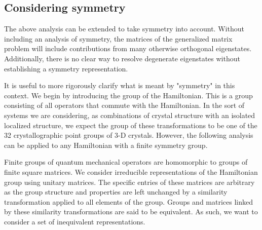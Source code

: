


%

\subsection{Considering symmetry}

The above analysis can be extended to take symmetry into account. Without
including an analysis of symmetry, the matrices of the generalized matrix
problem will include contributions from many otherwise orthogonal eigenstates.
Additionally, there is no clear way to resolve degenerate eigenstates without
establishing a symmetry representation.

It is useful to more rigorously clarify what is meant by "symmetry" in this
context. We begin by introducing the group of the Hamiltonian. This is a group
consisting of all operators that commute with the Hamiltonian. In the sort of
systems we are considering, as combinations of crystal structure with an
isolated localized structure, we expect the group of these transformations to be
one of the 32 crystallographic point groups of 3-D crystals. However, the
following analysis can be applied to any Hamiltonian with a finite symmetry
group.

Finite groups of quantum mechanical operators are homomorphic to groups of
finite square matrices. We consider irreducible representations of the
Hamiltonian group using unitary matrices. The specific entries of these matrices
are arbitrary as the group structure and properties are left unchanged by a
similarity transformation applied to all elements of the group. Groups and
matrices linked by these similarity transformations are said to be equivalent.
As such, we want to consider a set of inequivalent representations.

